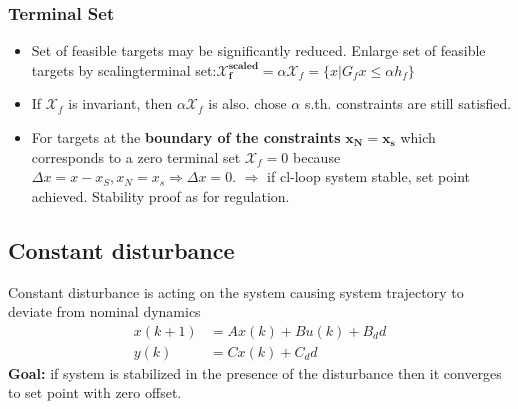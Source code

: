 \subsubsection{Terminal Set}
\begin{itemize}
    \item Set of feasible targets may be significantly reduced. Enlarge set of feasible targets by scalingterminal set:$\mathbf{\mathcal{X}^{scaled}_f}=\alpha \mathcal{X}_f = \{x|G_fx\leq \alpha h_f\}$
    \item If $\mathcal{X}_f$ is invariant, then $\alpha\mathcal{X}_f$ is also. chose $\alpha$ s.th. constraints are still satisfied.
    \item For targets at the \textbf{boundary of the constraints} $\mathbf{x_N = x_s}$ which corresponds to a zero terminal set $\mathcal{X}_f = 0$ because $\Delta x = x-x_S, x_N=x_s \Rightarrow \Delta x = 0.$
    $\Rightarrow$ if cl-loop system stable, set point achieved. Stability proof as for regulation.
\end{itemize}
\subsection{Constant disturbance}
Constant disturbance is acting on the system causing system trajectory to deviate from nominal dynamics
\begin{align*}
    x(k+1) &= Ax(k) + Bu(k) + B_dd\\
    y(k) &=Cx(k) + C_dd
\end{align*}
\textbf{Goal:} if system is stabilized in the presence of the disturbance then it converges to set point with zero offset.

